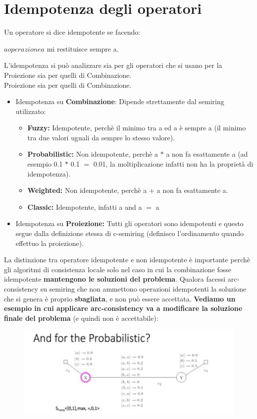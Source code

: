 \section{Idempotenza degli operatori}
Un operatore si dice idempotente se facendo:
\begin{center}
    $a operazione a$ mi restituisce sempre a.
\end{center}
L’idempotenza si può analizzare sia per gli operatori che si usano per la Proiezione sia per quelli di Combinazione.
\\Proiezione sia per quelli di Combinazione.
\begin{itemize}
    \item Idempotenza su \textbf{Combinazione}: Dipende strettamente dal semiring utilizzato:
    \begin{itemize}
        \item \textbf{Fuzzy:} Idempotente, perchè il minimo tra a ed a è sempre a (il minimo tra due valori uguali da sempre lo stesso valore).
        \item \textbf{Probabilistic:} Non idempotente, perchè a $*$ a non fa esattamente a (ad esempio 0.1 $*$ 0.1 $=$ 0.01, la moltiplicazione infatti non ha la proprietà di idempotenza).
        \item \textbf{Weighted:} Non idempotente, perchè a $+$ a non fa esattamente a.
        \item \textbf{Classic:} Idempotente, infatti a and a $=$ a
    \end{itemize}
    \item Idempotenza su \textbf{Proiezione:} Tutti gli operatori sono idempotenti e questo segue dalla definizione stessa di c-semiring (definisco l’ordinamento quando effettuo la proiezione).
\end{itemize}
La distinzione tra operatore idempotente e non idempotente è importante perchè gli algoritmi di consistenza locale solo nel caso in cui la combinazione fosse idempotente \textbf{mantengono le soluzioni del problema}. Qualora facessi arc-consistency su semiring che non ammettono operazioni idempotenti la soluzione che si genera è proprio \textbf{sbagliata}, e non può essere accettata.
\newpage
\textbf{Vediamo un esempio in cui applicare arc-consistency va a modificare la soluzione finale del problema} (e quindi non è accettabile):
\begin{figure}[htp]
	\centering
    \includegraphics[width=12cm, keepaspectratio]{img/Cap5/probabilistc.png}
\end{figure}
